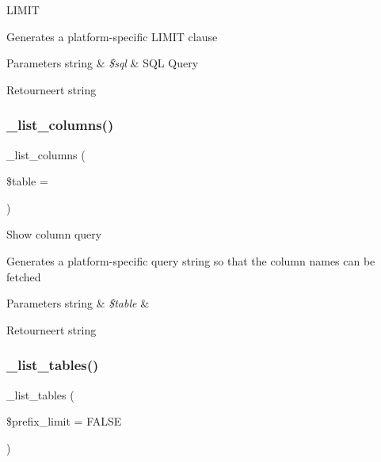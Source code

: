 L\+I\+M\+IT

Generates a platform-\/specific L\+I\+M\+IT clause


\begin{DoxyParams}[1]{Parameters}
string & {\em \$sql} & S\+QL Query \\
\hline
\end{DoxyParams}
\begin{DoxyReturn}{Retourneert}
string 
\end{DoxyReturn}
\mbox{\label{class_c_i___d_b__pdo__oci__driver_a7ccb7f9c301fe7f0a9db701254142b63}} 
\subsubsection{\texorpdfstring{\_list\_columns()}{\_list\_columns()}}
{\footnotesize\ttfamily \+\_\+list\+\_\+columns (\begin{DoxyParamCaption}\item[{}]{\$table = {\ttfamily \textquotesingle{}\textquotesingle{}} }\end{DoxyParamCaption})\hspace{0.3cm}{\ttfamily [protected]}}

Show column query

Generates a platform-\/specific query string so that the column names can be fetched


\begin{DoxyParams}[1]{Parameters}
string & {\em \$table} & \\
\hline
\end{DoxyParams}
\begin{DoxyReturn}{Retourneert}
string 
\end{DoxyReturn}
\mbox{\label{class_c_i___d_b__pdo__oci__driver_a435c0f3ce54fe7daa178baa8532ebd54}} 
\subsubsection{\texorpdfstring{\_list\_tables()}{\_list\_tables()}}
{\footnotesize\ttfamily \+\_\+list\+\_\+tables (\begin{DoxyParamCaption}\item[{}]{\$prefix\+\_\+limit = {\ttfamily FALSE} }\end{DoxyParamCaption})\hspace{0.3cm}{\ttfamily [protected]}}

